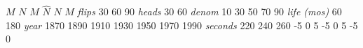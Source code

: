 \documentclass{book}
\begin{document}
{\small $M$}%
\stopmpxshipout
\mpxshipout%
{\small $N$}%
\stopmpxshipout
\mpxshipout%
{\small $M$}%
\stopmpxshipout
\mpxshipout%
{\small $\hat{N}$}%
\stopmpxshipout
\mpxshipout%
{\small $N$}%
\stopmpxshipout
\mpxshipout%
{\small $M$}%
\stopmpxshipout
\mpxshipout%
{\small \textit{flips}}%
\stopmpxshipout
\mpxshipout%
{\tiny 30}%
\stopmpxshipout
\mpxshipout%
{\tiny 60}%
\stopmpxshipout
\mpxshipout%
{\tiny 90}%
\stopmpxshipout
\mpxshipout%
{\small \textit{heads}}%
\stopmpxshipout
\mpxshipout%
{\tiny 30}%
\stopmpxshipout
\mpxshipout%
{\tiny 60}%
\stopmpxshipout
\mpxshipout%
{\small \textit{denom}}%
\stopmpxshipout
\mpxshipout%
{\tiny 10}%
\stopmpxshipout
\mpxshipout%
{\tiny 30}%
\stopmpxshipout
\mpxshipout%
{\tiny 50}%
\stopmpxshipout
\mpxshipout%
{\tiny 70}%
\stopmpxshipout
\mpxshipout%
{\tiny 90}%
\stopmpxshipout
\mpxshipout%
{\small \textit{life (mos)}}%
\stopmpxshipout
\mpxshipout%
{\tiny 60}%
\stopmpxshipout
\mpxshipout%
{\tiny 180}%
\stopmpxshipout
\mpxshipout%
{\small \textit{year}}%
\stopmpxshipout
\mpxshipout%
{\tiny 1870}%
\stopmpxshipout
\mpxshipout%
{\tiny 1890}%
\stopmpxshipout
\mpxshipout%
{\tiny 1910}%
\stopmpxshipout
\mpxshipout%
{\tiny 1930}%
\stopmpxshipout
\mpxshipout%
{\tiny 1950}%
\stopmpxshipout
\mpxshipout%
{\tiny 1970}%
\stopmpxshipout
\mpxshipout%
{\tiny 1990}%
\stopmpxshipout
\mpxshipout%
{\small \textit{seconds}}%
\stopmpxshipout
\mpxshipout%
{\tiny 220}%
\stopmpxshipout
\mpxshipout%
{\tiny 240}%
\stopmpxshipout
\mpxshipout%
{\tiny 260}%
\stopmpxshipout
\mpxshipout%
{\tiny -5}%
\stopmpxshipout
\mpxshipout%
{\tiny 0}%
\stopmpxshipout
\mpxshipout%
{\tiny 5}%
\stopmpxshipout
\mpxshipout%
{\tiny -5}%
\stopmpxshipout
\mpxshipout%
{\tiny 0}%
\stopmpxshipout
\mpxshipout%
{\tiny 5}%
\stopmpxshipout
\mpxshipout%
{\tiny -5}%
\stopmpxshipout
\mpxshipout%
{\tiny 0}%
\stopmpxshipout
\end{document}
